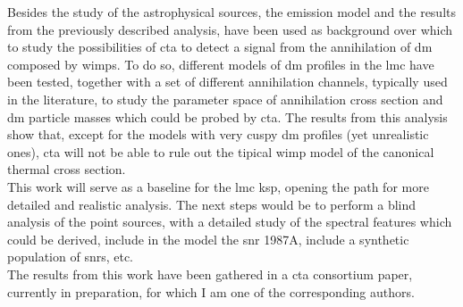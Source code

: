 \documentclass[main.tex]{subfiles}
\begin{document}
Besides the study of the astrophysical sources, the emission model and the results from the previously described analysis, have been used as background over which to study the possibilities of \gls{cta} to detect a signal from the annihilation of \gls{dm} composed by \glspl{wimp}. To do so, different models of \gls{dm} profiles in the \gls{lmc} have been tested, together with a set of different annihilation channels, typically used in the literature, to study the parameter space of annihilation cross section and \gls{dm} particle masses which could be probed by \gls{cta}. The results from this analysis show that, except for the models with very cuspy \gls{dm} profiles (yet unrealistic ones), \gls{cta} will not be able to rule out the tipical \gls{wimp} model of the canonical thermal cross section.\\
This work will serve as a baseline for the \gls{lmc} \gls{ksp}, opening the path for more detailed and realistic analysis. The next steps would be to perform a blind analysis of the point sources, with a detailed study of the spectral features which could be derived, include in the model the \gls{snr} 1987A, include a synthetic population of \glspl{snr}, etc.\\
The results from this work have been gathered in a \gls{cta} consortium paper, currently in preparation, for which I am one of the corresponding authors. 
\end{document}

